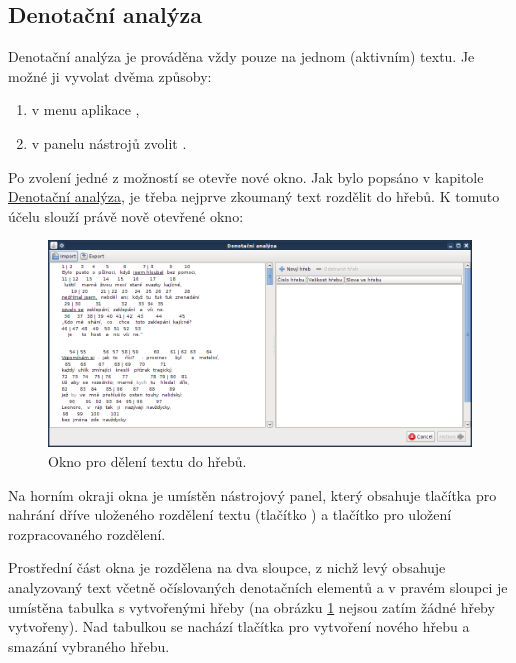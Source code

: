 \documentclass[dp.tex]{subfiles}
\begin{document}
\subsection{Denotační analýza}
\label{chap:app-denotation-analysis}
Denotační analýza je prováděna vždy pouze na jednom (aktivním) textu. Je možné ji vyvolat dvěma způsoby:

\begin{enumerate}
\item v menu aplikace ,
\item v panelu nástrojů zvolit .
\\
\end{enumerate}

Po zvolení jedné z možností se otevře nové okno. Jak bylo popsáno v kapitole \hyperref[chap:denotacni_analyza]{Denotační analýza}, je třeba nejprve zkoumaný text rozdělit do hřebů. K tomuto účelu slouží právě nově otevřené okno:
\begin{figure}[H]
\centering
\includegraphics[max width=\textwidth,keepaspectratio=true]{imgs-60-aplikace/gui-denotation-window}
\caption{Okno pro dělení textu do hřebů.}
\label{fig:gui-denotation-window}
\end{figure}

Na horním okraji okna je umístěn nástrojový panel, který obsahuje tlačítka pro nahrání dříve uloženého rozdělení textu (tlačítko ) a tlačítko  pro uložení rozpracovaného rozdělení. 

Prostřední část okna je rozdělena na dva sloupce, z nichž levý obsahuje analyzovaný text včetně očíslovaných denotačních elementů a v pravém sloupci je umístěna tabulka s vytvořenými hřeby (na obrázku \ref{fig:gui-denotation-window} nejsou zatím žádné hřeby vytvořeny). Nad tabulkou se nachází tlačítka pro vytvoření nového hřebu a smazání vybraného hřebu. 
\end{document}
